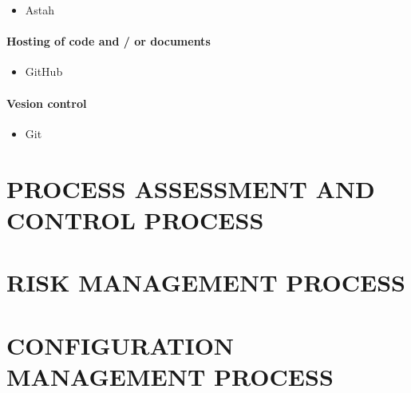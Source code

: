 \documentclass[11pt, twoside, a4paper]{book}
\begin{document}
						\begin{itemize}
							\item Astah
						\end{itemize}											
					
					\subsubsection{Hosting of code and / or documents}
        				
        				\begin{itemize}
        					\item GitHub
        				\end{itemize}
        				
					\subsubsection{Vesion control}
					
						\begin{itemize}
							\item Git
						\end{itemize}        	
        				
        \chapter{PROCESS ASSESSMENT AND CONTROL PROCESS}
                    
        \chapter{RISK MANAGEMENT PROCESS}
        
        \chapter{CONFIGURATION MANAGEMENT PROCESS}
    
    
\end{document}
